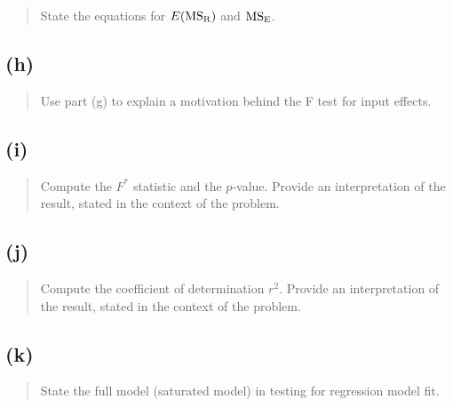 \documentclass[
]{article}
\begin{document}
\begin{quote}
State the equations for \(E(\mathrm{MS_{R}})\) and \(\mathrm{MS_{E}}\).
\end{quote}

\vspace{50pt}

\hypertarget{h}{%
\subsection{(h)}\label{h}}

\begin{quote}
Use part (g) to explain a motivation behind the F test for input
effects.
\end{quote}

\vspace{50pt}

\hypertarget{i}{%
\subsection{(i)}\label{i}}

\begin{quote}
Compute the \(F^*\) statistic and the \(p\)-value. Provide an
interpretation of the result, stated in the context of the problem.
\end{quote}

\vspace{50pt}

\hypertarget{j}{%
\subsection{(j)}\label{j}}

\begin{quote}
Compute the coefficient of determination \(r^2\). Provide an
interpretation of the result, stated in the context of the problem.
\end{quote}

\vspace{50pt}

\hypertarget{k}{%
\subsection{(k)}\label{k}}

\begin{quote}
State the full model (saturated model) in testing for regression model
fit.
\end{quote}

\vspace{50pt}
\end{document}
